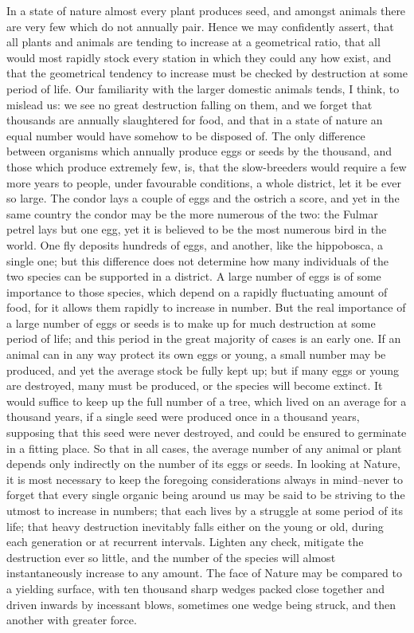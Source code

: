 In a state of nature almost every plant produces seed, and amongst animals there are very few which do not annually pair. Hence we may confidently assert, that all plants and animals are tending to increase at a geometrical ratio, that all would most rapidly stock every station in which they could any how exist, and that the geometrical tendency to increase must be checked by destruction at some period of life. Our familiarity with the larger domestic animals tends, I think, to mislead us: we see no great destruction falling on them, and we forget that thousands are annually slaughtered for food, and that in a state of nature an equal number would have somehow to be disposed of.
The only difference between organisms which annually produce eggs or seeds by the thousand, and those which produce extremely few, is, that the slow-breeders would require a few more years to people, under favourable conditions, a whole district, let it be ever so large. The condor lays a couple of eggs and the ostrich a score, and yet in the same country the condor may be the more numerous of the two: the Fulmar petrel lays but one egg, yet it is believed to be the most numerous bird in the world. One fly deposits hundreds of eggs, and another, like the hippobosca, a single one; but this difference does not determine how many individuals of the two species can be supported in a district. A large number of eggs is of some importance to those species, which depend on a rapidly fluctuating amount of food, for it allows them rapidly to increase in number. But the real importance of a large number of eggs or seeds is to make up for much destruction at some period of life; and this period in the great majority of cases is an early one. If an animal can in any way protect its own eggs or young, a small number may be produced, and yet the average stock be fully kept up; but if many eggs or young are destroyed, many must be produced, or the species will become extinct. It would suffice to keep up the full number of a tree, which lived on an average for a thousand years, if a single seed were produced once in a thousand years, supposing that this seed were never destroyed, and could be ensured to germinate in a fitting place. So that in all cases, the average number of any animal or plant depends only indirectly on the number of its eggs or seeds.
In looking at Nature, it is most necessary to keep the foregoing considerations always in mind--never to forget that every single organic being around us may be said to be striving to the utmost to increase in numbers; that each lives by a struggle at some period of its life; that heavy destruction inevitably falls either on the young or old, during each generation or at recurrent intervals. Lighten any check, mitigate the destruction ever so little, and the number of the species will almost instantaneously increase to any amount. The face of Nature may be compared to a yielding surface, with ten thousand sharp wedges packed close together and driven inwards by incessant blows, sometimes one wedge being struck, and then another with greater force.
